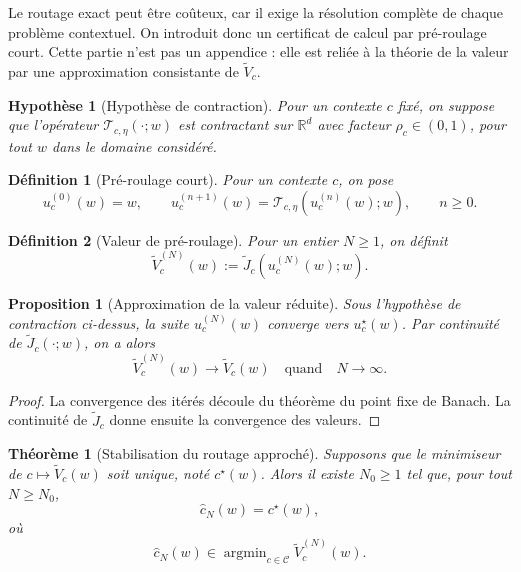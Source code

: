 \documentclass[11pt,a4paper]{article}
\newtheorem{definition}{Définition}[section]
\newtheorem{assumption}{Hypothèse}[section]
\newtheorem{proposition}{Proposition}[section]
\newtheorem{theorem}{Théorème}[section]
\DeclareMathOperator{\argmin}{argmin}
\newcommand{\R}{\mathbb R}
\newcommand{\Ccal}{\mathcal C}
\newcommand{\Tcal}{\mathcal T}
\begin{document}
Le routage exact peut être coûteux, car il exige la résolution complète de chaque problème contextuel. On introduit donc un certificat de calcul par pré-roulage court. Cette partie n'est pas un appendice : elle est reliée à la théorie de la valeur par une approximation consistante de \(\widetilde V_c\).

\begin{assumption}[Hypothèse de contraction]
Pour un contexte \(c\) fixé, on suppose que l'opérateur \(\Tcal_{c,\eta}(\cdot;w)\) est contractant sur \(\R^d\) avec facteur \(\rho_c\in(0,1)\), pour tout \(w\) dans le domaine considéré.
\end{assumption}

\begin{definition}[Pré-roulage court]
Pour un contexte \(c\), on pose
\[
u_c^{(0)}(w)=w,
\qquad
u_c^{(n+1)}(w)=\Tcal_{c,\eta}(u_c^{(n)}(w);w),
\qquad n\ge 0.
\]
\end{definition}

\begin{definition}[Valeur de pré-roulage]
Pour un entier \(N\ge 1\), on définit
\[
\widetilde V_c^{(N)}(w):=\widetilde J_c(u_c^{(N)}(w);w).
\]
\end{definition}

\begin{proposition}[Approximation de la valeur réduite]
Sous l'hypothèse de contraction ci-dessus, la suite \(u_c^{(N)}(w)\) converge vers \(u_c^\star(w)\). Par continuité de \(\widetilde J_c(\cdot;w)\), on a alors
\[
\widetilde V_c^{(N)}(w)\longrightarrow \widetilde V_c(w)
\quad\text{quand}\quad N\to\infty.
\]
\end{proposition}

\begin{proof}
La convergence des itérés découle du théorème du point fixe de Banach. La continuité de \(\widetilde J_c\) donne ensuite la convergence des valeurs.
\end{proof}

\begin{theorem}[Stabilisation du routage approché]
Supposons que le minimiseur de \(c\mapsto \widetilde V_c(w)\) soit unique, noté \(c^\star(w)\). Alors il existe \(N_0\ge 1\) tel que, pour tout \(N\ge N_0\),
\[
\hat c_N(w)=c^\star(w),
\]
où
\[
\hat c_N(w)\in\argmin_{c\in\Ccal}\widetilde V_c^{(N)}(w).
\]
\end{theorem}
\end{document}
